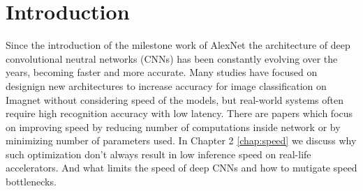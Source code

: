 

\chapter{Introduction}







Since the introduction of the milestone work of AlexNet \cite{krizhevsky2012_imagenet_alexnet} the architecture of deep convolutional neutral networks (CNNs) has been constantly evolving over the years, becoming faster and more accurate. Many studies have focused on designign new architectures to increase accuracy for image classification on Imagnet without considering speed of the models, but real-world systems often require high recognition accuracy with low latency. There are papers which focus on improving speed by reducing number of computations inside network or by minimizing number of parameters used. In Chapter 2 \ref{chap:speed} we discuss why such optimization don't always result in low inference speed on real-life accelerators. And what limits the speed of deep CNNs and how to mutigate speed bottlenecks.

